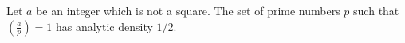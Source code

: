 Let $a$ be an integer which is not a square. The set of prime numbers $p$ such that $\left(\frac{a}{p}\right) = 1$ has analytic density $1/2$.
